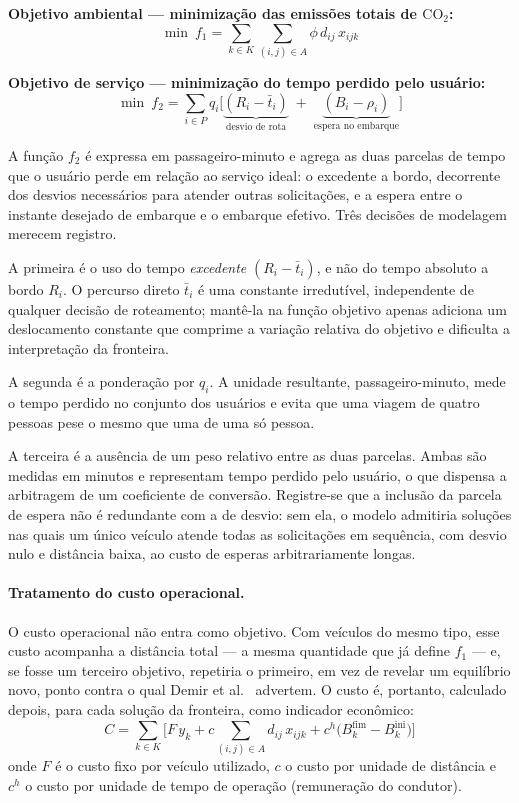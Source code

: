 \documentclass[12pt,a4paper]{article}
\theoremstyle{plain}
\begin{document}
\textbf{Objetivo ambiental --- minimização das emissões totais de $\text{CO}_2$:}
\begin{equation}
\min\ f_1 = \sum_{k \in K} \sum_{(i,j) \in A} \phi\, d_{ij}\, x_{ijk}
\label{eq:f1}
\end{equation}

\textbf{Objetivo de serviço --- minimização do tempo perdido pelo usuário:}
\begin{equation}
\min\ f_2 = \sum_{i \in P} q_i \Big[ \underbrace{(R_i - \bar{t}_i)}_{\text{desvio de rota}} \;+\; \underbrace{(B_i - \rho_i)}_{\text{espera no embarque}} \Big]
\label{eq:f2}
\end{equation}

A função $f_2$ é expressa em passageiro-minuto e agrega as duas parcelas de tempo que o usuário perde em relação ao serviço ideal: o excedente a bordo, decorrente dos desvios necessários para atender outras solicitações, e a espera entre o instante desejado de embarque e o embarque efetivo. Três decisões de modelagem merecem registro.

A primeira é o uso do tempo \textit{excedente} $(R_i - \bar{t}_i)$, e não do tempo absoluto a bordo $R_i$. O percurso direto $\bar{t}_i$ é uma constante irredutível, independente de qualquer decisão de roteamento; mantê-la na função objetivo apenas adiciona um deslocamento constante que comprime a variação relativa do objetivo e dificulta a interpretação da fronteira.

A segunda é a ponderação por $q_i$. A unidade resultante, passageiro-minuto, mede o tempo perdido no conjunto dos usuários e evita que uma viagem de quatro pessoas pese o mesmo que uma de uma só pessoa.

A terceira é a ausência de um peso relativo entre as duas parcelas. Ambas são medidas em minutos e representam tempo perdido pelo usuário, o que dispensa a arbitragem de um coeficiente de conversão. Registre-se que a inclusão da parcela de espera não é redundante com a de desvio: sem ela, o modelo admitiria soluções nas quais um único veículo atende todas as solicitações em sequência, com desvio nulo e distância baixa, ao custo de esperas arbitrariamente longas.

\paragraph{Tratamento do custo operacional.} O custo operacional não entra como objetivo. Com veículos do mesmo tipo, esse custo acompanha a distância total --- a mesma quantidade que já define $f_1$ --- e, se fosse um terceiro objetivo, repetiria o primeiro, em vez de revelar um equilíbrio novo, ponto contra o qual Demir et al.~\cite{demir2014} advertem. O custo é, portanto, calculado depois, para cada solução da fronteira, como indicador econômico:
\begin{equation}
C = \sum_{k \in K}\Big[ F\, y_k + c \sum_{(i,j) \in A} d_{ij}\, x_{ijk} + c^{h}\big(B^{\text{fim}}_k - B^{\text{ini}}_k\big)\Big]
\label{eq:custo}
\end{equation}
onde $F$ é o custo fixo por veículo utilizado, $c$ o custo por unidade de distância e $c^{h}$ o custo por unidade de tempo de operação (remuneração do condutor).
\end{document}
